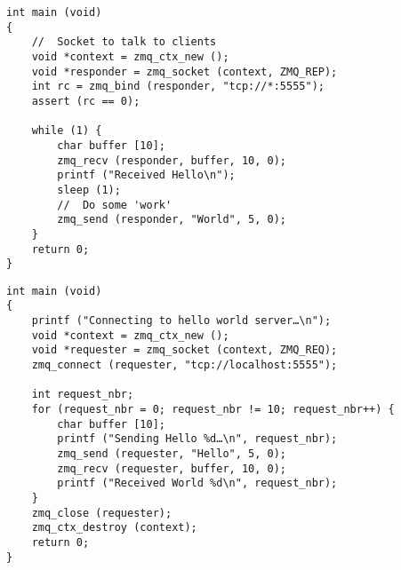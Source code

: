 \begin{lstlisting}[caption=Exempel på serverkod i $\oldemptyset$MQ, label=hw-server]
int main (void)
{
    //  Socket to talk to clients
    void *context = zmq_ctx_new ();
    void *responder = zmq_socket (context, ZMQ_REP);
    int rc = zmq_bind (responder, "tcp://*:5555");
    assert (rc == 0);

    while (1) {
        char buffer [10];
        zmq_recv (responder, buffer, 10, 0);
        printf ("Received Hello\n");
        sleep (1);          
        //  Do some 'work'
        zmq_send (responder, "World", 5, 0);
    }
    return 0;
}
\end{lstlisting}

\begin{lstlisting}[caption=Exempel på klientkod i $\oldemptyset$MQ, label=hw-server]
int main (void)
{
    printf ("Connecting to hello world server…\n");
    void *context = zmq_ctx_new ();
    void *requester = zmq_socket (context, ZMQ_REQ);
    zmq_connect (requester, "tcp://localhost:5555");

    int request_nbr;
    for (request_nbr = 0; request_nbr != 10; request_nbr++) {
        char buffer [10];
        printf ("Sending Hello %d…\n", request_nbr);
        zmq_send (requester, "Hello", 5, 0);
        zmq_recv (requester, buffer, 10, 0);
        printf ("Received World %d\n", request_nbr);
    }
    zmq_close (requester);
    zmq_ctx_destroy (context);
    return 0;
}
\end{lstlisting}